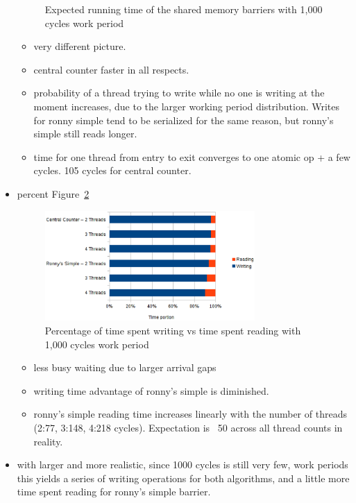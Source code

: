 \documentclass[a4paper, 10pt]{article}
\begin{document}
\begin{itemize}
\begin{figure}[htbp]
			\caption{Expected running time of the shared memory barriers with 1,000 cycles work period}
			\label{fig:cs-work-1000-B-C-D}
		\end{figure}
		\begin{itemize}
			\item very different picture.
			\item central counter faster in all respects.
			\item probability of a thread trying to write while no one is writing at the moment increases, due to the larger working period distribution. Writes for ronny simple tend to be serialized for the same reason, but ronny's simple still reads longer.
			\item time for one thread from entry to exit converges to one atomic op + a few cycles. 105 cycles for central counter.
		\end{itemize}
	\item percent Figure~\ref{fig:cs-work-1000-percent}
		\begin{figure}[htbp]
			\centering
			\includegraphics[width=8cm]{charts/cs-work-1000-percent}
			\caption{Percentage of time spent writing vs time spent reading with 1,000 cycles work period}
			\label{fig:cs-work-1000-percent}
		\end{figure}
		\begin{itemize}
			\item less busy waiting due to larger arrival gaps
			\item writing time advantage of ronny's simple is diminished.
			\item ronny's simple reading time increases linearly with the number of threads (2:77, 3:148, 4:218 cycles). Expectation is ~50 across all thread counts in reality.
		\end{itemize}
	\item with larger and more realistic, since 1000 cycles is still very few, work periods this yields a series of writing operations for both algorithms, and a little more time spent reading for ronny's simple barrier.
\end{itemize}
\end{document}
